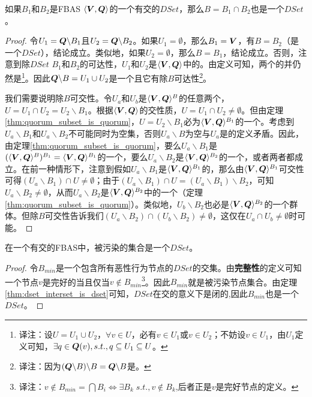\begin{theorem}\label{thm:dset_interset_is_dset}
        如果$B_1$和$B_2$是FBAS $\langle{\bm V},{\bm Q}\rangle$的一个有{\quorum}交的$DSet$，那么$B=B_1\cap B_2$也是一个$DSet$。
\end{theorem}

\begin{proof}
        令$U_1={\bm Q}\backslash B_1$且$U_2={\bm Q}\backslash B_2$。如果$U_1=\emptyset$，那么$B_1={\bm V}$，有$B=B_2$（是一个$DSet$），结论成立。类似地，如果$U_2=\emptyset$，那么$B=B_1$，结论成立。否则，注意到除$DSet$ $B_1$和$B_2$的{\quorum}可达性，$U_1$和$U_2$是$\langle{\bm V},{\bm Q}\rangle$中的{\quorum}。由定义可知，两个{\quorum}的并仍然是{\quorum}{\footnote{译注：设$U=U_1\cup U_2$，$\forall v\in U$，必有$v\in U_1$或$v\in U_2$；不妨设$v\in U_1$，由$U_1$定义可知，$\exists q\in {\bm Q}(v), s.t., q\subseteq U_1\subseteq U$。}}。因此${{\bm Q}\backslash B}=U_1\cup U_2$是一个{\quorum}且它有除$B${\quorum}可达性{\footnote{译注：因为$({\bm Q}\backslash B)\backslash B={\bm Q}\backslash B$是{\quorum}。}}。
        
        我们需要说明除$B${\quorum}可交性。令$U_a$和$U_b$是$\langle{\bm V},{\bm Q}\rangle^{B}$的任意两个{\quorum}，$U=U_1\cap U_2 = U_2\backslash B_1$。根据$\langle{\bm V},{\bm Q}\rangle$的{\quorum}交性质，$U=U_1\cap U_2  \neq \emptyset$。但由定理\ref{thm:quorum_subset_is_quorum}，$U=U_2\backslash B_1$必为$\langle{\bm V},{\bm Q}\rangle^{B_1}$的一个{\quorum}。考虑到$U_a\backslash B_1$和$U_a\backslash B_2$不可能同时为空集，否则$U_a\backslash B$为空与$U_a$是{\quorum}的定义矛盾。因此，由定理\ref{thm:quorum_subset_is_quorum}，要么$U_a\backslash B_1$是$(\langle{\bm V},{\bm Q}\rangle^{B})^{B_1}=\langle{\bm V},{\bm Q}\rangle^{B_1}$的一个{\quorum}，要么$U_a\backslash B_2$是$\langle{\bm V},{\bm Q}\rangle^{B_2}$的一个{\quorum}，或者两者都成立。在前一种情形下，注意到假如$U_a\backslash B_1$是$\langle{\bm V},{\bm Q}\rangle^{B_1}$的{\quorum}，那么由$\langle{\bm V},{\bm Q}\rangle^{B_1}${\quorum}可交性可得$(U_a\backslash B_1)\cap U\neq \emptyset$；由于$(U_a\backslash B_1)\cap U = (U_a\backslash B_1)\backslash B_2$，可知$U_a\backslash B_2\neq \emptyset$，从而$U_a\backslash B_2$是$\langle{\bm V},{\bm Q}\rangle^{B_2}$中的一个{\quorum}（定理\ref{thm:quorum_subset_is_quorum}）。类似地，$U_b\backslash B_2$也必是$\langle{\bm V},{\bm Q}\rangle^{B_2}$的一个群体。但除$B${\quorum}可交性告诉我们$(U_a\backslash B_2)\cap (U_b\backslash B_2)\neq \emptyset$，这仅在$U_a\cap U_b\neq \emptyset$时可能。
\end{proof}

\begin{theorem}\label{thm:befouleds_are_dset}
        在一个有{\quorum}交的FBAS中，被污染的集合是一个$DSet$。
\end{theorem}

\begin{proof}
        令$B_{min}$是一个包含所有恶性行为节点的$DSet$的交集。由\textbf{完整性}的定义可知一个节点$v$是完好的当且仅当$v\not\in B_{min}${\footnote{译注：$v\not\in B_{min}=\bigcap B_{i}\iff \exists B_{k}\;s.t., v\not\in B_{k}$,后者正是$v$是完好节点的定义。}}。因此$B_{min}$就是被污染节点集合。由定理\ref{thm:dset_interset_is_dset}可知，$DSet$在交的意义下是闭的,因此$B_{min}$也是一个$DSet$。
\end{proof}
